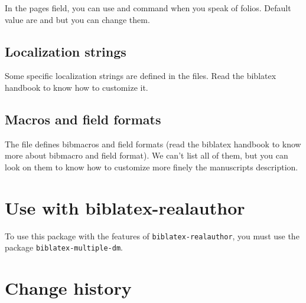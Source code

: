 \documentclass{ltxdockit}[2011/03/25]
\newcommand{\biblatex}{biblatex\xspace}
\begin{document}
In the pages field, you can use  and  command when you speak of folios. Default value are  and  but you can change them.

\subsection{Localization strings}

Some specific localization strings are defined in the  files. Read the \biblatex handbook to know how to customize it.

\subsection{Macros and field formats}

The  file defines bibmacros and field formats (read the \biblatex handbook to know more about bibmacro and field format). We can't list all of them, but you can look on them to know how to customize more finely the manuscripts description.

\section{Use with biblatex-realauthor}\label{biblatex-multiple-dm}

To use this package with the features of \verb+biblatex-realauthor+, you must use the package \verb+biblatex-multiple-dm+.


\section{Change history}
\end{document}
